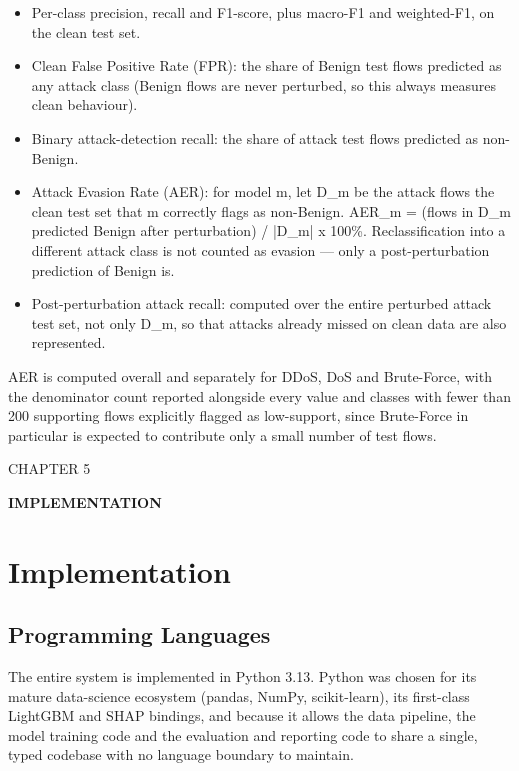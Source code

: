 \documentclass[12pt,a4paper]{report}
\begin{document}
\begin{itemize}\setlength\itemsep{2pt}\item Per-class precision, recall and F1-score, plus macro-F1 and weighted-F1, on the clean test set.\end{itemize}
\begin{itemize}\setlength\itemsep{2pt}\item Clean False Positive Rate (FPR): the share of Benign test flows predicted as any attack class (Benign flows are never perturbed, so this always measures clean behaviour).\end{itemize}
\begin{itemize}\setlength\itemsep{2pt}\item Binary attack-detection recall: the share of attack test flows predicted as non-Benign.\end{itemize}
\begin{itemize}\setlength\itemsep{2pt}\item Attack Evasion Rate (AER): for model m, let D\_m be the attack flows the clean test set that m correctly flags as non-Benign. AER\_m = (flows in D\_m predicted Benign after perturbation) / |D\_m| x 100\%. Reclassification into a different attack class is not counted as evasion --- only a post-perturbation prediction of Benign is.\end{itemize}
\begin{itemize}\setlength\itemsep{2pt}\item Post-perturbation attack recall: computed over the entire perturbed attack test set, not only D\_m, so that attacks already missed on clean data are also represented.\end{itemize}
AER is computed overall and separately for DDoS, DoS and Brute-Force, with the denominator count reported alongside every value and classes with fewer than 200 supporting flows explicitly flagged as low-support, since Brute-Force in particular is expected to contribute only a small number of test flows.

\begin{center}CHAPTER 5\end{center}
\begin{center}\textbf{IMPLEMENTATION}\end{center}\vspace{4pt}
\chapter{Implementation}
\section{Programming Languages}
The entire system is implemented in Python 3.13. Python was chosen for its mature data-science ecosystem (pandas, NumPy, scikit-learn), its first-class LightGBM and SHAP bindings, and because it allows the data pipeline, the model training code and the evaluation and reporting code to share a single, typed codebase with no language boundary to maintain.
\end{document}
